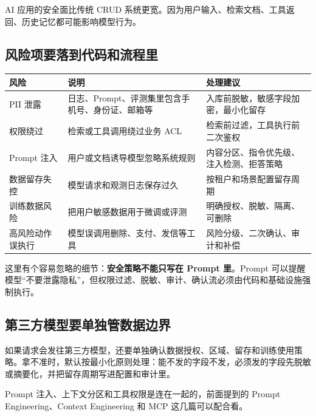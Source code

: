 \documentclass[9pt,a4paper,twocolumn]{ctexart}
\begin{document}
AI 应用的安全面比传统 CRUD 系统更宽。因为用户输入、检索文档、工具返回、历史记忆都可能影响模型行为。



\subsection*{风险项要落到代码和流程里}

{\footnotesize
\begin{tabular}{|p{}|p{}|p{}|}
\hline
\textbf{风险} & \textbf{说明} & \textbf{处理建议} \\
\hline
PII 泄露 & 日志、Prompt、评测集里包含手机号、身份证、邮箱等 & 入库前脱敏，敏感字段加密，最小化留存 \\
\hline
权限绕过 & 检索或工具调用绕过业务 ACL & 检索前过滤，工具执行前二次鉴权 \\
\hline
Prompt 注入 & 用户或文档诱导模型忽略系统规则 & 内容分区、指令优先级、注入检测、拒答策略 \\
\hline
数据留存失控 & 模型请求和观测日志保存过久 & 按租户和场景配置留存周期 \\
\hline
训练数据风险 & 把用户敏感数据用于微调或评测 & 明确授权、脱敏、隔离、可删除 \\
\hline
高风险动作误执行 & 模型误调用删除、支付、发信等工具 & 风险分级、二次确认、审计和补偿 \\
\hline
\end{tabular}
}



这里有个容易忽略的细节：\textbf{安全策略不能只写在 Prompt 里}。Prompt 可以提醒模型“不要泄露隐私”，但权限过滤、脱敏、审计、确认流必须由代码和基础设施强制执行。



\subsection*{第三方模型要单独管数据边界}


如果请求会发往第三方模型，还要单独确认数据授权、区域、留存和训练使用策略。拿不准时，默认按最小化原则处理：能不发的字段不发，必须发的字段先脱敏或摘要化，并把留存周期写进配置和审计里。



Prompt 注入、上下文分区和工具权限是连在一起的，前面提到的 Prompt Engineering、Context Engineering 和 MCP 这几篇可以配合看。
\end{document}
